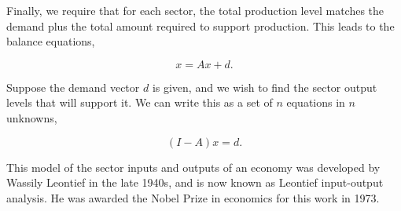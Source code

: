 Finally, we require that for each sector, the total production level matches the demand plus the total amount required to support production. This leads to the balance equations,

\[x=Ax+d.\]

Suppose the demand vector \(d\) is given, and we wish to find the sector output levels that will support it. We can write this as a set of \(n\) equations in \(n\) unknowns,

\[(I-A)x=d.\]

This model of the sector inputs and outputs of an economy was developed by Wassily Leontief in the late 1940s, and is now known as Leontief input-output analysis. He was awarded the Nobel Prize in economics for this work in 1973.

 